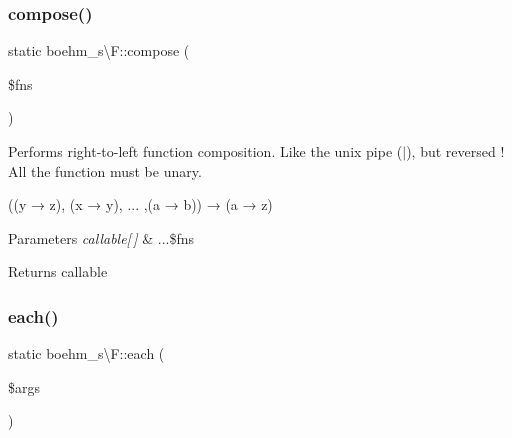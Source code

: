 \subsubsection{\texorpdfstring{compose()}{compose()}}
{\footnotesize\ttfamily static boehm\+\_\+s\textbackslash{}\+F\+::compose (\begin{DoxyParamCaption}\item[{}]{\$fns }\end{DoxyParamCaption})\hspace{0.3cm}{\ttfamily [static]}}

Performs right-\/to-\/left function composition. Like the unix pipe ($\vert$), but reversed ! All the function must be unary.


\begin{DoxyCode}
((y → z), (x → y), ... ,(a → b)) → (a → z) 
\end{DoxyCode}
 
 
\begin{DoxyParams}{Parameters}
{\em callable\mbox{[}$\,$\mbox{]}} & ...\$fns \\
\hline
\end{DoxyParams}
\begin{DoxyReturn}{Returns}
callable 
\end{DoxyReturn}
\mbox{\label{classboehm__s_1_1F_adf594aee11edbf796efae99d00dc8f46}} 
\subsubsection{\texorpdfstring{each()}{each()}}
{\footnotesize\ttfamily static boehm\+\_\+s\textbackslash{}\+F\+::each (\begin{DoxyParamCaption}\item[{}]{\$args }\end{DoxyParamCaption})\hspace{0.3cm}{\ttfamily [static]}}

